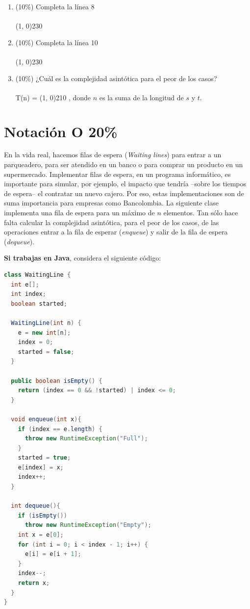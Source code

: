 \documentclass[10 pt]{article}
\begin{document}
  \begin{enumerate}[label=(\Alph*)]
    \item (10\%) Completa la línea 8 \\ \\
    \line(1, 0){230}
    \item (10\%) Completa la línea 10 \\ \\
    \line(1, 0){230}
    \item (10\%) ¿Cuál es la complejidad asintótica para el peor de los casos? \\ \\
    T(n) = \line(1, 0){210} , donde $n$ es la suma de la longitud de $s$ y $t$.
  \end{enumerate}

\newpage




\section{Notación O 20\%}
En la vida real,  hacemos filas de espera (\textit{Waiting lines}) para entrar a un parqueadero, para ser atendido en un banco o para comprar un producto en un supermercado.
 Implementar filas de espera, en un programa informático, es importante para simular, por ejemplo, el impacto que tendría
 --sobre los tiempos de espera-- el contratar un nuevo cajero. Por eso, estas implementaciones son de suma importancia para empresas como Bancolombia. 
La siguiente clase implementa una fila de espera para un máximo de $n$ elementos. Tan sólo hace falta calcular la complejidad asintótica, para el peor de los
casos, de las operaciones entrar a la fila de esperar (\textit{enqueue}) y salir de la fila de espera (\textit{dequeue}). 

\hspace{1 cm}

\textbf{Si trabajas en Java}, considera el siguiente código:

\begin{lstlisting}[language = Java]
class WaitingLine {
  int e[];
  int index;
  boolean started;

  WaitingLine(int n) {
    e = new int[n];
    index = 0;
    started = false;
  }

  public boolean isEmpty() {
    return (index == 0 && !started) | index <= 0;
  }

  void enqueue(int x){
    if (index == e.length) {
      throw new RuntimeException("Full");
    }
    started = true;
    e[index] = x;
    index++;
  }

  int dequeue(){
    if (isEmpty())
      throw new RuntimeException("Empty");
    int x = e[0];
    for (int i = 0; i < index - 1; i++) {
      e[i] = e[i + 1];
    }
    index--;
    return x;
  }
}
\end{lstlisting}
\end{document}
